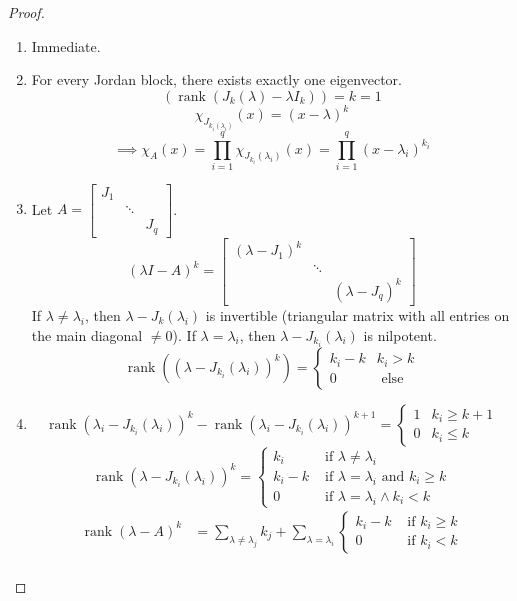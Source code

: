 \documentclass[a4paper]{article}
\numberwithin{lecref}{section}
\DeclareMathOperator{\rank}{rank}
\begin{document}
\begin{proof}
  \begin{enumerate}
    \item Immediate.
    \item For every Jordan block, there exists exactly one eigenvector.
      \[ \left(\rank(J_k(\lambda) - \lambda I_k)\right) = k = 1 \]
      \[ \chi_{J_{k_i(\lambda_i)}}(x) = (x - \lambda)^k \]
      \[ \implies \chi_A(x) = \prod_{i=1}^q \chi_{J_{k_i}(\lambda_i)}(x) = \prod_{i=1}^q (x - \lambda_i)^{k_i} \]
    \item Let $A = \begin{bmatrix} J_1 & & \\ & \ddots & \\ & & J_q \end{bmatrix}$.
      \[ (\lambda I - A)^k = \begin{bmatrix} (\lambda - J_1)^k & & \\ & \ddots & \\ & & (\lambda - J_q)^k \end{bmatrix} \]
      If $\lambda \neq \lambda_i$, then $\lambda - J_k(\lambda_i)$ is invertible (triangular matrix with all entries on the main diagonal $\neq 0$).
      If $\lambda = \lambda_i$, then $\lambda - J_{k_i}(\lambda_i)$ is nilpotent.
      \[
        \rank((\lambda - J_{k_i}(\lambda_i))^k) = \begin{cases}
          k_i - k & k_i > k \\
          0 & \text{ else}
        \end{cases}
      \]
    \item
      \[ \rank(\lambda_i - J_{k_i}(\lambda_i))^k - \rank(\lambda_i - J_{k_i}(\lambda_i))^{k+1} = \begin{cases} 1 & k_i \geq k+1 \\ 0 & k_i \leq k \end{cases} \]
      \[
        \rank(\lambda - J_{k_i}(\lambda_i))^k = \begin{cases}
          k_i & \text{ if } \lambda \neq \lambda_i \\
          k_i - k & \text{ if } \lambda = \lambda_i \text{ and } k_i \geq k \\
          0 & \text{ if } \lambda = \lambda_i \land k_i < k
        \end{cases}
      \]
      \begin{align*}
        \rank(\lambda - A)^k &= \sum_{\lambda \neq \lambda_j} k_j + \sum_{\lambda = \lambda_i} \begin{cases} k_i - k & \text{ if } k_i \geq k \\ 0 & \text{ if } k_i < k \end{cases} \\

\end{align*}
\end{enumerate}
\end{proof}
\end{document}
